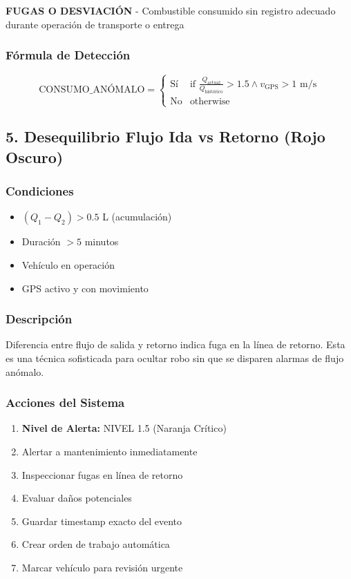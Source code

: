 \documentclass[12pt,a4paper,oneside]{report}
\begin{document}
\textbf{FUGAS O DESVIACIÓN} - Combustible consumido sin registro adecuado durante operación de transporte o entrega

\subsubsection{Fórmula de Detección}

\[
\text{CONSUMO\_ANÓMALO} = \begin{cases}
\text{Sí} & \text{if } \frac{Q_{\text{actual}}}{Q_{\text{histórico}}} > 1.5 \land v_{\text{GPS}} > 1 \text{ m/s} \\
\text{No} & \text{otherwise}
\end{cases}
\]

\subsection{5. Desequilibrio Flujo Ida vs Retorno (Rojo Oscuro)}

\subsubsection{Condiciones}

\begin{itemize}
    \item $(Q_1 - Q_2) > 0.5$ L (acumulación)
    \item Duración $> 5$ minutos
    \item Vehículo en operación
    \item GPS activo y con movimiento
\end{itemize}

\subsubsection{Descripción}

Diferencia entre flujo de salida y retorno indica fuga en la línea de retorno. Esta es una técnica sofisticada para ocultar robo sin que se disparen alarmas de flujo anómalo.

\subsubsection{Acciones del Sistema}

\begin{enumerate}
    \item \textbf{Nivel de Alerta:} NIVEL 1.5 (Naranja Crítico)
    \item Alertar a mantenimiento inmediatamente
    \item Inspeccionar fugas en línea de retorno
    \item Evaluar daños potenciales
    \item Guardar timestamp exacto del evento
    \item Crear orden de trabajo automática
    \item Marcar vehículo para revisión urgente
\end{enumerate}
\end{document}
